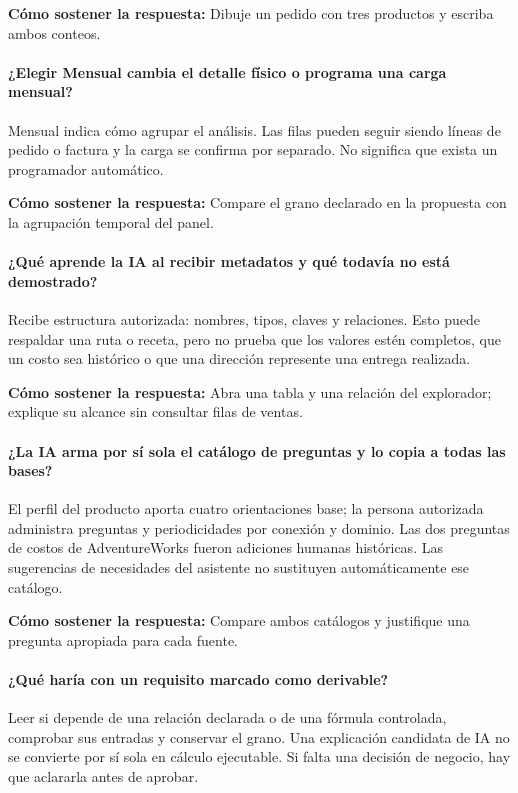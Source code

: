 \textbf{Cómo sostener la respuesta:} Dibuje un pedido con tres productos y escriba ambos conteos.

\paragraph{¿Elegir Mensual cambia el detalle físico o programa una carga mensual?} Mensual indica cómo agrupar el análisis. Las filas pueden seguir siendo líneas de pedido o factura y la carga se confirma por separado. No significa que exista un programador automático.

\textbf{Cómo sostener la respuesta:} Compare el grano declarado en la propuesta con la agrupación temporal del panel.

\paragraph{¿Qué aprende la IA al recibir metadatos y qué todavía no está demostrado?} Recibe estructura autorizada: nombres, tipos, claves y relaciones. Esto puede respaldar una ruta o receta, pero no prueba que los valores estén completos, que un costo sea histórico o que una dirección represente una entrega realizada.

\textbf{Cómo sostener la respuesta:} Abra una tabla y una relación del explorador; explique su alcance sin consultar filas de ventas.

\paragraph{¿La IA arma por sí sola el catálogo de preguntas y lo copia a todas las bases?} El perfil del producto aporta cuatro orientaciones base; la persona autorizada administra preguntas y periodicidades por conexión y dominio. Las dos preguntas de costos de AdventureWorks fueron adiciones humanas históricas. Las sugerencias de necesidades del asistente no sustituyen automáticamente ese catálogo.

\textbf{Cómo sostener la respuesta:} Compare ambos catálogos y justifique una pregunta apropiada para cada fuente.

\paragraph{¿Qué haría con un requisito marcado como derivable?} Leer si depende de una relación declarada o de una fórmula controlada, comprobar sus entradas y conservar el grano. Una explicación candidata de IA no se convierte por sí sola en cálculo ejecutable. Si falta una decisión de negocio, hay que aclararla antes de aprobar.

